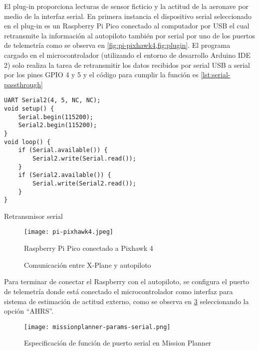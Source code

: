 El plug-in proporciona lecturas de sensor ficticio y la actitud de la aeronave por medio de la interfaz serial. En primera instancia el dispositivo serial seleccionado en el plug-in es un Raspberry Pi Pico conectado al computador por USB el cual retransmite la información al autopiloto también por serial por uno de los puertos de telemetría como se observa en \cref{fig:pi-pixhawk4,fig:plugin}. El programa cargado en el microcontrolador (utilizando el entorno de desarrollo Arduino IDE 2) solo realiza la tarea de retransmitir los datos recibidos por serial USB a serial por los pines GPIO 4 y 5 y el código para cumplir la función es \cref{lst:serial-passthrough}

\begin{listing}[h]
    \begin{verbatim}
UART Serial2(4, 5, NC, NC);
void setup() {
    Serial.begin(115200);
    Serial2.begin(115200);
}
void loop() {
    if (Serial.available()) {
        Serial2.write(Serial.read());
    }
    if (Serial2.available()) {
        Serial.write(Serial2.read());
    }
}
    \end{verbatim}
    \caption{Retransmisor serial}
    \label{lst:serial-passthrough}
\end{listing}

\begin{figure}[h]
    \centering
    \texttt{[image: pi-pixhawk4.jpeg]}
    \caption{Raspberry Pi Pico conectado a Pixhawk 4}
    \label{fig:pi-pixhawk4}
\end{figure}

\begin{figure}[h]
    \centering
    
    \caption{Comunicación entre X-Plane y autopiloto}
    \label{fig:plugin}
\end{figure}

Para terminar de conectar el Raspberry con el autopiloto, se configura el puerto de telemetría donde está conectado el microcontrolador como interfaz para sistema de estimación de actitud externo, como se observa en \cref{fig:missionplanner-params-serial} seleccionando la opción ``AHRS''.

\begin{figure}[h]
    \centering
    \texttt{[image: missionplanner-params-serial.png]}
    \caption{Especificación de función de puerto serial en Mission Planner}
    \label{fig:missionplanner-params-serial}
\end{figure}

